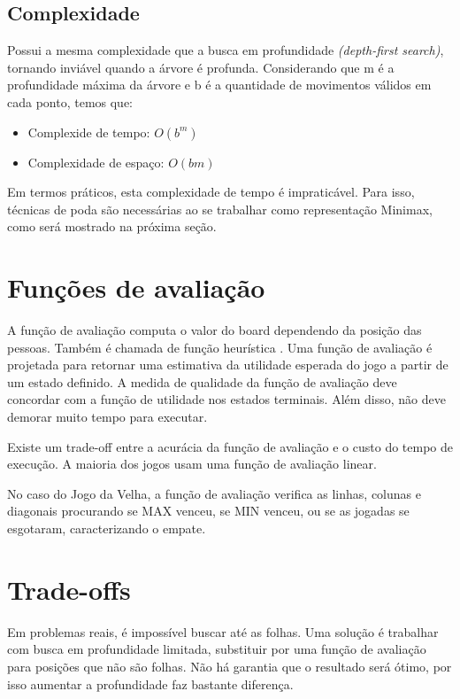 \documentclass[sigplan,screen]{acmart}
\begin{document}
\subsection{Complexidade}

Possui a mesma complexidade que a busca em profundidade {\itshape (depth-first search)}, tornando inviável quando a árvore é profunda.
Considerando que m é a profundidade máxima da árvore e b é a quantidade de movimentos válidos em cada ponto, temos que:
\begin{itemize}
  \item Complexide de tempo: $O(b^m)$
  \item Complexidade de espaço: $O(bm)$
\end{itemize}

Em termos práticos, esta complexidade de tempo é impraticável. Para isso, técnicas de poda são necessárias ao se trabalhar como representação Minimax, como será mostrado na próxima seção.

\section{Funções de avaliação}

A função de avaliação computa o valor do board dependendo da posição das pessoas. Também é chamada de função heurística \cite{Aradhya02}. 
Uma função de avaliação é projetada para retornar uma estimativa da utilidade esperada do jogo a partir de um estado definido. 
A medida de qualidade da função de avaliação deve concordar com a função de utilidade nos estados terminais. Além disso, não deve demorar muito tempo para executar.

Existe um trade-off entre a acurácia da função de avaliação e o custo do tempo de execução. 
A maioria dos jogos usam uma função de avaliação linear.

No caso do Jogo da Velha, a função de avaliação verifica as linhas, colunas e diagonais procurando se MAX venceu, se MIN venceu, ou se as jogadas se esgotaram, caracterizando o empate.


\section{Trade-offs}

Em problemas reais, é impossível buscar até as folhas. 
Uma solução é trabalhar com busca em profundidade limitada, substituir por uma função de avaliação para posições que não são folhas.
Não há garantia que o resultado será ótimo, por isso aumentar a profundidade faz bastante diferença.
\end{document}
